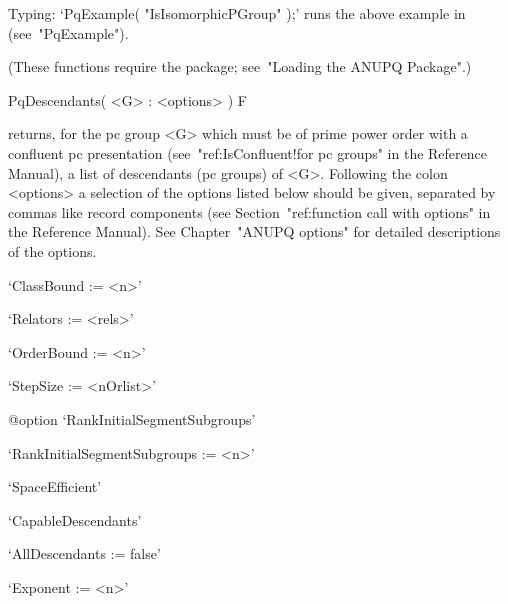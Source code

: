 Typing: `PqExample( "IsIsomorphicPGroup" );' runs the  above  example  in
{\GAP} (see~"PqExample").

(These functions require the {\ANUPQ}  package;  see~"Loading  the  ANUPQ
Package".)


\>PqDescendants( <G> : <options> ) F

returns, for the pc group <G> which must be of prime power order  with  a
confluent pc presentation (see~"ref:IsConfluent!for  pc  groups"  in  the
{\GAP} Reference Manual), a list  of  descendants  (pc  groups)  of  <G>.
Following the colon <options> a selection of  the  options  listed  below
should  be  given,  separated  by  commas  like  record  components  (see
Section~"ref:function call with options" in the {\GAP} Reference Manual).
See Chapter~"ANUPQ options" for detailed descriptions of the options.

\beginlist%

\item{}`ClassBound := <n>'

\item{}`Relators := <rels>'

\item{}`OrderBound := <n>'

\item{}`StepSize := <nOrlist>'

%
{@option \noexpand`RankInitialSegmentSubgroups'}
\item{}`RankInitialSegmentSubgroups := <n>'

\item{}`SpaceEfficient'

\item{}`CapableDescendants'

\item{}`AllDescendants := false'

\item{}`Exponent := <n>'

